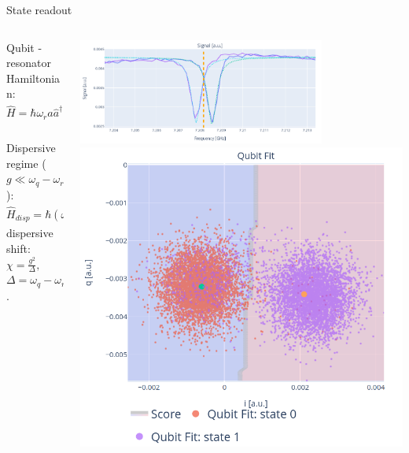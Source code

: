 \documentclass[aspectratio=169,10pt]{beamer}
\begin{document}
\begin{frame}{State readout}
  \begin{columns}
    \begin{column}{0.35\textwidth}
      Qubit - resonator Hamiltonian:
      \begin{equation*}
        \hat{H} = \hbar\omega_r\hat{a}\hat{a}^\dagger - \frac{\hbar\omega_{01}}{2}\hat{\sigma}_z + \hbar g(\hat{\sigma}^+\hat{a}+\hat{\sigma}^-\hat{a}^\dagger);
      \end{equation*}\\
      \vspace{1.5em}
      Dispersive regime ($g \ll \omega_q - \omega_r$):
      \begin{equation*}
        \hat{H}_{disp} = \hbar(\omega_r - \chi\hat{\sigma}_z)\hat{a}^\dagger\hat{a} - \frac{\hbar}{2}(\omega_{01}+\chi)\hat{\sigma}_z;
      \end{equation*}
      dispersive shift: $\chi = \frac{g^2}{\Delta},$ \hfill $\Delta = \omega_q - \omega_r$.
    \end{column}
    \begin{column}{0.65\textwidth}
      \centering
      \includegraphics[width=0.75\textwidth]{figures/disp_sihft.png}
      \hspace{5mm}
      \includegraphics[height=0.48\textwidth]{figures/classification.png}
    \end{column}
  \end{columns}
\end{frame}
\end{document}
